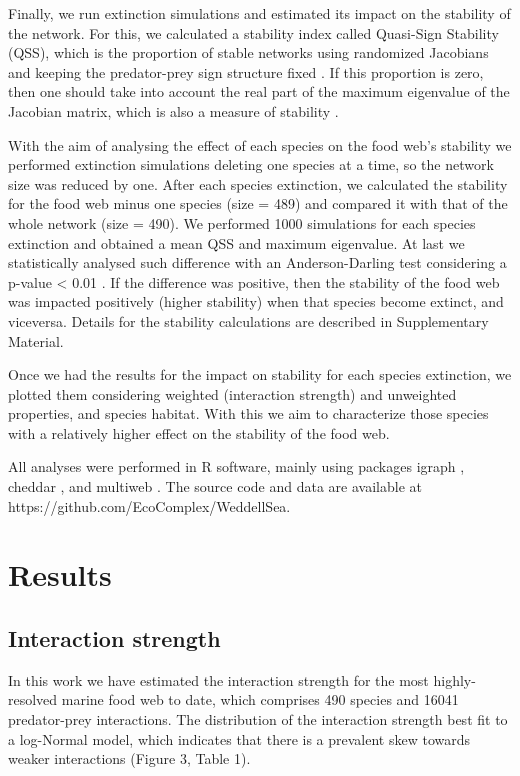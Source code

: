 \documentclass[gc, manuscript]{copernicus}
\begin{document}
Finally, we run extinction simulations and estimated its impact on the
stability of the network. For this, we calculated a stability index
called Quasi-Sign Stability (QSS), which is the proportion of stable
networks using randomized Jacobians and keeping the predator-prey sign
structure fixed \citep{Allesina2008}. If this proportion is zero, then
one should take into account the real part of the maximum eigenvalue of
the Jacobian matrix, which is also a measure of stability
\citep{Grilli2016}.

With the aim of analysing the effect of each species on the food web's
stability we performed extinction simulations deleting one species at a
time, so the network size was reduced by one. After each species
extinction, we calculated the stability for the food web minus one
species (size = 489) and compared it with that of the whole network
(size = 490). We performed 1000 simulations for each species extinction
and obtained a mean QSS and maximum eigenvalue. At last we statistically
analysed such difference with an Anderson-Darling test considering a
p-value \textless{} 0.01 \citep{Scholz1987}. If the difference was
positive, then the stability of the food web was impacted positively
(higher stability) when that species become extinct, and viceversa.
Details for the stability calculations are described in Supplementary
Material.

Once we had the results for the impact on stability for each species
extinction, we plotted them considering weighted (interaction strength)
and unweighted properties, and species habitat. With this we aim to
characterize those species with a relatively higher effect on the
stability of the food web.

All analyses were performed in R software, mainly using packages igraph
\citep{Csardi2005}, cheddar \citep{Hudson2013}, and multiweb
\citep{Saravia2019}. The source code and data are available at
https://github.com/EcoComplex/WeddellSea.

\section{Results}

\subsection{Interaction strength}

In this work we have estimated the interaction strength for the most
highly-resolved marine food web to date, which comprises 490 species and
16041 predator-prey interactions. The distribution of the interaction
strength best fit to a log-Normal model, which indicates that there is a
prevalent skew towards weaker interactions (Figure 3, Table 1).
\end{document}
